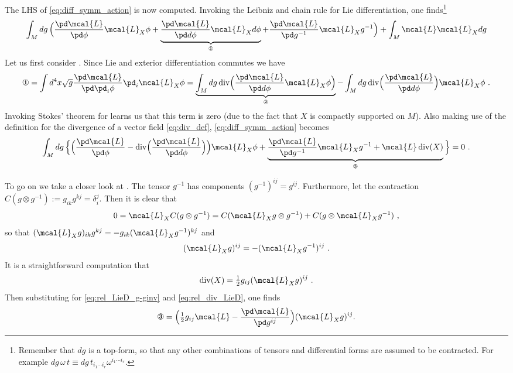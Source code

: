 \documentclass[11pt]{article}
\begin{document}
The LHS of \eqref{eq:diff_symm_action} is now computed. Invoking 
the Leibniz and chain rule for Lie differentiation, one 
finds\footnote{Remember that $dg$ is a top-form, so that any 
	other combinations of tensors and differential forms are 
	assumed to be contracted. For example $dg\, \omega\, t \equiv 
	dg\, t_{i_1\cdots i_r}\omega^{i_1\cdots i_r}$.} 
%
\begin{displaymath}
	\int_M dg\, \Big( \frac{\pd \mcal{L}}{\pd \phi} \mcal{L}_X\phi 
	+ \underbrace{\frac{\pd \mcal{L}}{\pd d\phi} 
		\mcal{L}_Xd\phi}_\text{\ding{172}} + \frac{\pd 
		\mcal{L}}{\pd g^{-1}}\mcal{L}_Xg^{-1} \Big) + \int_M 
	\mcal{L}\mcal{L}_X dg
\end{displaymath}
Let us first consider . Since Lie and exterior 
differentiation commutes we have
%
\begin{displaymath}
	\text{\ding{172}} = \int d^4x \sqrt{g} \frac{\pd 
		\mcal{L}}{\pd\pd_i\phi} \pd_i \mcal{L}_X\phi = 
	\underbrace{\int_M dg\, \mathrm{div}\Big(\frac{\pd 
			\mcal{L}}{\pd d\phi} \mcal{L}_X\phi 
		\Big)}_\text{\ding{173}} - \int_M dg\, \mathrm{div} \Big( 
	\frac{\pd \mcal{L}}{\pd d\phi}\Big) \mcal{L}_X\phi~.
\end{displaymath}
Invoking Stokes' theorem for  learns us that this term 
is zero (due to the fact that $X$ is compactly supported on $M$).  
Also making use of the definition for the divergence of a vector 
field \eqref{eq:div_def}, \eqref{eq:diff_symm_action} becomes
%
\begin{displaymath}
	\int_M dg\, \Big\{\Big( \frac{\pd \mcal{L}}{\pd \phi} 
		-\mathrm{div}\Big(\frac{\pd\mcal{L}}{\pd d\phi}\Big)\Big) 
		\mcal{L}_X\phi + \underbrace{\frac{\pd\mcal{L}}{\pd 
				g^{-1}}\mcal{L}_X g^{-1} + \mcal{L} 
			\,\mathrm{div}(X)}_\text{\ding{174}}\Big\} = 0~.
\end{displaymath}

To go on we take a closer look at . The tensor $g^{-1}$ 
has components $(g^{-1})^{ij} =g^{ij}$. Furthermore, let the 
contraction $C(g\otimes g^{-1}) := g_{ik}g^{kj} = \delta^j_i$.  
Then it is clear that
%
\begin{displaymath}
	0 = \mcal{L}_X C(g\otimes g^{-1}) = C(\mcal{L}_X g \otimes 
	g^{-1}) + C(g \otimes \mcal{L}_X g^{-1})~,
\end{displaymath}
so that $(\mcal{L}_X g)_{ik}g^{kj} = -g_{ik} (\mcal{L}_X 
g^{-1})^{kj}$ and
%
\begin{equation}\label{eq:rel_LieD_g-ginv}
	(\mcal{L}_X g)^{ij} = -(\mcal{L}_X g^{-1})^{ij}~.
\end{equation}
%
It is a straightforward computation that
%
\begin{equation}\label{eq:rel_div_LieD}
	\mathrm{div}(X) = \tfrac{1}{2}g_{ij}(\mcal{L}_Xg)^{ij}~.
\end{equation}
Then substituting  for \eqref{eq:rel_LieD_g-ginv} and 
\eqref{eq:rel_div_LieD}, one finds
%
\begin{displaymath}
	\text{\ding{174}} = \Big(\tfrac{1}{2}g_{ij}\mcal{L} - 
	\frac{\pd \mcal{L}}{\pd g^{ij}} \Big)(\mcal{L}_X g)^{ij}.
\end{displaymath}
\end{document}
